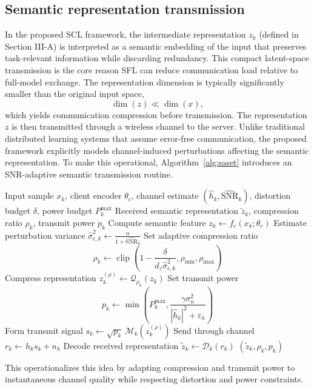 \documentclass[10pt,journal]{IEEEtran}
\begin{document}
\subsection{Semantic representation transmission}
In the proposed SCL framework, the intermediate representation $z_k$ (defined in Section III-A) is interpreted as a semantic embedding of the input that preserves task-relevant information while discarding redundancy. This compact latent-space transmission is the core reason SFL can reduce communication load relative to full-model exchange.
The representation dimension is typically significantly smaller than the original input space,
\begin{equation}
\dim(z) \ll \dim(x),
\end{equation}
which yields communication compression before transmission.
The representation $z$ is then transmitted through a wireless channel to the server. Unlike traditional distributed learning systems that assume error-free communication, the proposed framework explicitly models channel-induced perturbations affecting the semantic representation\cite{10741277,11134601}. To make this operational, Algorithm~\ref{alg:saset} introduces an SNR-adaptive semantic transmission routine.
\begin{algorithm}[htbp]
\caption{Proposed SNR-Adaptive Semantic Encoding and Transmission (SASET)}
\label{alg:saset}
\begin{algorithmic}[1]
\REQUIRE Input sample $x_k$, client encoder $\theta_c$, channel estimate $(\hat{h}_k,\widehat{\mathrm{SNR}}_k)$, distortion budget $\delta$, power budget $P_k^{\max}$
\ENSURE Received semantic representation $\tilde{z}_k$, compression ratio $\rho_k$, transmit power $p_k$
\STATE Compute semantic feature $z_k \leftarrow f_c(x_k;\theta_c)$
\STATE Estimate perturbation variance $\hat{\sigma}_{\epsilon,k}^2 \leftarrow \frac{\alpha}{1+\widehat{\mathrm{SNR}}_k}$
\STATE Set adaptive compression ratio\[\rho_k \leftarrow \operatorname{clip}\left(1-\frac{\delta}{d_z\hat{\sigma}_{\epsilon,k}^2},\rho_{\min},\rho_{\max}\right)\]
\STATE Compress representation $z_k^{(\rho)} \leftarrow \mathcal{Q}_{\rho_k}(z_k)$
\STATE Set transmit power\[p_k \leftarrow \min\left(P_k^{\max},\frac{\gamma\sigma_n^2}{|\hat{h}_k|^2+\varepsilon_h}\right)\]
\STATE Form transmit signal $s_k \leftarrow \sqrt{p_k}\,\mathcal{M}_k(z_k^{(\rho)})$
\STATE Send through channel $r_k \leftarrow h_k s_k + n_k$
\STATE Decode received representation $\tilde{z}_k \leftarrow \mathcal{D}_k(r_k)$
\RETURN $(\tilde{z}_k,\rho_k,p_k)$
\end{algorithmic}
\end{algorithm}
This operationalizes this idea by adapting compression and transmit power to instantaneous channel quality while respecting distortion and power constraints.
\end{document}

